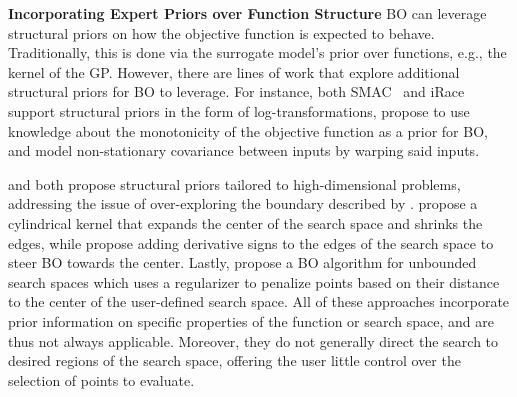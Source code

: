 \documentclass{article}
\newcommand{\frank}[1]{\todo[color=yellow]{Frank: #1}} %
\newcommand{\luigi}[1]{\todo[color=orange]{Luigi: #1}}
\begin{document}
\textbf{Incorporating Expert Priors over Function Structure}\quad 
BO can leverage structural priors on how the objective function is expected to behave. Traditionally, this is done via the surrogate model's prior over functions, e.g., the kernel of the GP. However, there are lines of work that explore additional structural priors for BO to leverage. For instance, both SMAC~\citep{smac} and iRace~\citep{lopez2016irace} support structural priors in the form of log-transformations, \citet{liaccelerating} propose to use knowledge about the monotonicity of the objective function as a prior for BO, and \citet{pmlr-v32-snoek14} model non-stationary covariance between inputs by warping said inputs.

\citet{oh2018bock} and \citet{siivola2018correcting} both propose structural priors tailored to high-dimensional problems, addressing the issue of over-exploring the boundary described by \citet{swersky2017improving}. \citet{oh2018bock} propose a cylindrical kernel that expands the center of the search space and shrinks the edges, while \citet{siivola2018correcting} propose adding derivative signs to the edges of the search space to steer BO towards the center. 
Lastly, \citet{shahriari2016unbounded} propose a BO algorithm for unbounded search spaces which uses a regularizer to penalize points based on their distance to the center of the user-defined search space. 
All of these approaches incorporate prior information on specific properties of the function or search space, and are thus not always applicable. Moreover, they do not generally direct the search to desired regions of the search space, offering the user little control over the selection of points to evaluate.%
\end{document}
